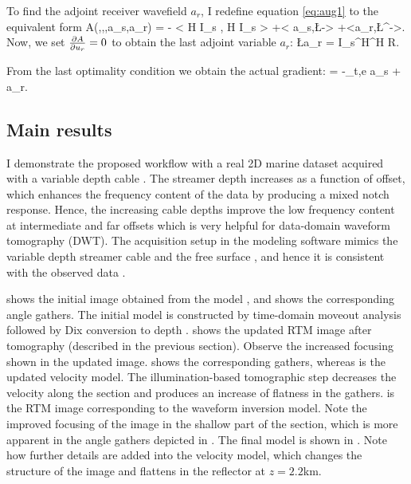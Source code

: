 To find the adjoint receiver wavefield $a_r$, I redefine  equation \ref{eq:aug1}  to 
the equivalent form
\beq
    A(\m,\us,\ur,a_s,a_r) = - < H I_s \ur, H I_s \ur> +< a_s,\L\us-\fs> +<a_r,\L^\top\ur-\fr>.
\eeq
Now, we set $\frac{\partial A }{\partial {u_r}}=0$ to obtain the last adjoint variable $a_r$:
\beq
   \L a_r = I_s^\top H^\top H R.
\eeq

From the last optimality condition we obtain the actual gradient:
\beq
  =  -\sum_{t,e}  a_s + a_r.
\label{eq:gradJ2}
\eeq

\subsection{Main results}
 I demonstrate the proposed workflow with a real 2D marine dataset
acquired with a variable depth cable  \citep{soubaras2010variable}.
The streamer depth increases as a function of offset, which enhances the frequency
content of the data by producing a mixed notch response. Hence,
the increasing cable depths improve the low frequency content at 
intermediate and far offsets which is very helpful for data-domain waveform tomography (DWT). The acquisition setup 
in the modeling software mimics the
variable depth streamer cable and the free surface \citep{hicks2002arbitrary}, and hence it is consistent with the observed data .
  
  shows the initial image obtained from the model , and  
shows the corresponding angle gathers. The initial model is constructed by time-domain moveout analysis followed
by Dix conversion to depth \citep{dix}.  shows the updated RTM image
after tomography (described in the previous section). Observe the increased focusing shown in the updated image. 
  shows the corresponding gathers, whereas  is the updated velocity model. The
illumination-based tomographic step decreases the velocity along the section and produces an increase of flatness
in the gathers.  is the RTM image corresponding to the waveform inversion model. Note the improved
focusing of the image in the shallow part of the section, which is more apparent in the angle gathers 
depicted in . The final model is shown in . Note how further details are 
added into the velocity model, which changes the structure of the image and flattens in the
reflector at $z=2.2$km. 

